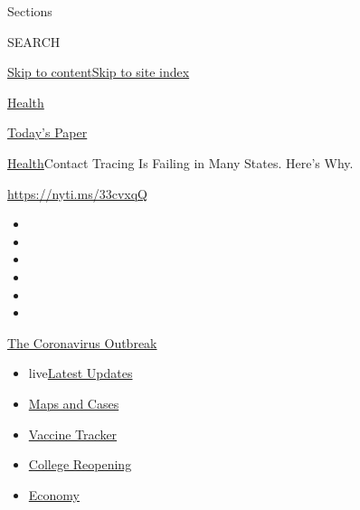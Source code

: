 Sections

SEARCH

\protect\hyperlink{site-content}{Skip to
content}\protect\hyperlink{site-index}{Skip to site index}

\href{https://www.nytimes.com/section/health}{Health}

\href{https://myaccount.nytimes.com/auth/login?response_type=cookie\&client_id=vi}{}

\href{https://www.nytimes.com/section/todayspaper}{Today's Paper}

\href{/section/health}{Health}\textbar{}Contact Tracing Is Failing in
Many States. Here's Why.

\url{https://nyti.ms/33cvxqQ}

\begin{itemize}
\item
\item
\item
\item
\item
\item
\end{itemize}

\href{https://www.nytimes.com/news-event/coronavirus?action=click\&pgtype=Article\&state=default\&region=TOP_BANNER\&context=storylines_menu}{The
Coronavirus Outbreak}

\begin{itemize}
\tightlist
\item
  live\href{https://www.nytimes.com/2020/08/04/world/coronavirus-cases.html?action=click\&pgtype=Article\&state=default\&region=TOP_BANNER\&context=storylines_menu}{Latest
  Updates}
\item
  \href{https://www.nytimes.com/interactive/2020/us/coronavirus-us-cases.html?action=click\&pgtype=Article\&state=default\&region=TOP_BANNER\&context=storylines_menu}{Maps
  and Cases}
\item
  \href{https://www.nytimes.com/interactive/2020/science/coronavirus-vaccine-tracker.html?action=click\&pgtype=Article\&state=default\&region=TOP_BANNER\&context=storylines_menu}{Vaccine
  Tracker}
\item
  \href{https://www.nytimes.com/2020/08/02/us/covid-college-reopening.html?action=click\&pgtype=Article\&state=default\&region=TOP_BANNER\&context=storylines_menu}{College
  Reopening}
\item
  \href{https://www.nytimes.com/live/2020/08/04/business/stock-market-today-coronavirus?action=click\&pgtype=Article\&state=default\&region=TOP_BANNER\&context=storylines_menu}{Economy}
\end{itemize}

